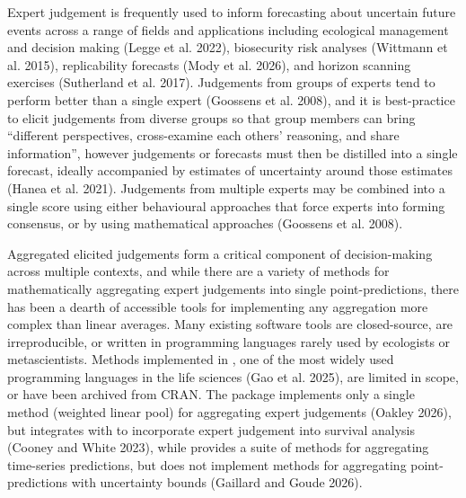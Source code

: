 \documentclass[
  11pt,
  a4paper,
]{article}
\begin{document}
Expert judgement is frequently used to inform forecasting about
uncertain future events across a range of fields and applications
including ecological management and decision making (Legge et al. 2022),
biosecurity risk analyses (Wittmann et al. 2015), replicability
forecasts (Mody et al. 2026), and horizon scanning exercises (Sutherland
et al. 2017). Judgements from groups of experts tend to perform better
than a single expert (Goossens et al. 2008), and it is best-practice to
elicit judgements from diverse groups so that group members can bring
``different perspectives, cross-examine each others' reasoning, and
share information'', however judgements or forecasts must then be
distilled into a single forecast, ideally accompanied by estimates of
uncertainty around those estimates ({Hanea et al.} 2021). Judgements
from multiple experts may be combined into a single score using either
behavioural approaches that force experts into forming consensus, or by
using mathematical approaches (Goossens et al. 2008).

Aggregated elicited judgements form a critical component of
decision-making across multiple contexts, and while there are a variety
of methods for mathematically aggregating expert judgements into single
point-predictions, there has been a dearth of accessible tools for
implementing any aggregation more complex than linear averages. Many
existing software tools are closed-source, are irreproducible, or
written in programming languages rarely used by ecologists or
metascientists. Methods implemented in , one of the most
widely used programming languages in the life sciences (Gao et al.
2025), are limited in scope, or have been archived from CRAN. The
 package  implements only a single method
(weighted linear pool) for aggregating expert judgements (Oakley 2026),
but integrates with  to incorporate expert judgement
into survival analysis (Cooney and White 2023), while 
provides a suite of methods for aggregating time-series predictions, but
does not implement methods for aggregating point-predictions with
uncertainty bounds (Gaillard and Goude 2026).
\end{document}
